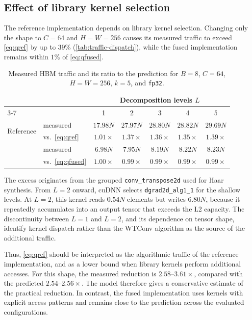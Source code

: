 \documentclass[10pt]{article} %
\theoremstyle{plain}
\begin{document}
\subsection{Effect of library kernel selection}
\label{app:traffic-bad}

The reference implementation depends on library kernel selection. Changing only
the shape to $C{=}64$ and $H{=}W{=}256$ causes its measured traffic to exceed
\autoref{eq:qref} by up to $39\%$ (\autoref{tab:traffic-dispatch}), while the
fused implementation remains within $1\%$ of \autoref{eq:qfused}.

\begin{table}[h]
\centering
\caption{Measured HBM traffic and its ratio to the prediction for $B{=}8$,
$C{=}64$, $H{=}W{=}256$, $k{=}5$, and \texttt{fp32}.}
\label{tab:traffic-dispatch}
\begin{tabular}{llccccc}
\toprule
& & \multicolumn{5}{c}{Decomposition levels $L$}\\
\cmidrule(lr){3-7}
& & 1 & 2 & 3 & 4 & 5 \\
\midrule
\multirow{2}{*}{Reference}
  & measured               & $17.98N$ & $27.97N$ & $28.80N$ & $28.82N$ & $29.69N$ \\
  & vs.\ \autoref{eq:qref} & $1.01\times$ & $1.37\times$ & $1.36\times$ & $1.35\times$ & $1.39\times$ \\
\addlinespace[3pt]
\multirow{2}{*}{Fused}
  & measured                 & $6.98N$ & $7.95N$ & $8.19N$ & $8.22N$ & $8.23N$ \\
  & vs.\ \autoref{eq:qfused} & $1.00\times$ & $0.99\times$ & $0.99\times$ & $0.99\times$ & $0.99\times$ \\
\bottomrule
\end{tabular}
\end{table}

The excess originates from the grouped \texttt{conv\_transpose2d} used for Haar
synthesis. From $L{=}2$ onward, cuDNN selects
\texttt{dgrad2d\_alg1\_1} for the shallow levels. At $L{=}2$, this kernel reads
$0.54N$ elements but writes $6.80N$, because it repeatedly accumulates into an
output tensor that exceeds the L2 capacity. The discontinuity between $L{=}1$
and $L{=}2$, and its dependence on tensor shape, identify kernel dispatch rather
than the WTConv algorithm as the source of the additional traffic.

Thus, \autoref{eq:qref} should be interpreted as the algorithmic traffic of the
reference implementation, and as a lower bound when library kernels perform
additional accesses. For this shape, the measured reduction is
$2.58$--$3.61\times$, compared with the predicted $2.54$--$2.56\times$. The
model therefore gives a conservative estimate of the practical reduction. In
contrast, the fused implementation uses kernels with explicit access patterns
and remains close to the prediction across the evaluated configurations.
\end{document}
